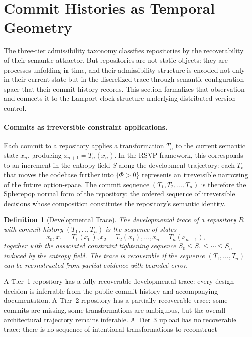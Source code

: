\documentclass[11pt]{article}
\newtheorem{definition}[theorem]{Definition}
\begin{document}

\section{Commit Histories as Temporal Geometry}

The three-tier admissibility taxonomy classifies repositories by the
recoverability of their semantic attractor. But repositories are not static
objects: they are processes unfolding in time, and their admissibility structure
is encoded not only in their current state but in the discretized trace through
semantic configuration space that their commit history records. This section
formalizes that observation and connects it to the Lamport clock structure
underlying distributed version control.

\paragraph{Commits as irreversible constraint applications.}
Each commit to a repository applies a transformation $T_n$ to the current
semantic state $x_n$, producing $x_{n+1} = T_n(x_n)$. In the RSVP framework,
this corresponds to an increment in the entropy field $S$ along the development
trajectory: each $T_n$ that moves the codebase further into $\{\Phi > 0\}$
represents an irreversible narrowing of the future option-space. The commit
sequence $(T_1, T_2, \ldots, T_n)$ is therefore the Spherepop normal form of
the repository: the ordered sequence of irreversible decisions whose composition
constitutes the repository's semantic identity.

\begin{definition}[Developmental Trace]
The \emph{developmental trace} of a repository $R$ with commit history
$(T_1, \ldots, T_n)$ is the sequence of states
\[
x_0, x_1 = T_1(x_0), x_2 = T_2(x_1), \ldots, x_n = T_n(x_{n-1}),
\]
together with the associated constraint tightening sequence
$S_0 \leq S_1 \leq \cdots \leq S_n$ induced by the entropy field. The trace
is \emph{recoverable} if the sequence $(T_1, \ldots, T_n)$ can be
reconstructed from partial evidence with bounded error.
\end{definition}

A Tier~1 repository has a fully recoverable developmental trace: every design
decision is inferrable from the public commit history and accompanying
documentation. A Tier~2 repository has a partially recoverable trace: some
commits are missing, some transformations are ambiguous, but the overall
architectural trajectory remains inferable. A Tier~3 upload has no
recoverable trace: there is no sequence of intentional transformations to
reconstruct.
\end{document}
